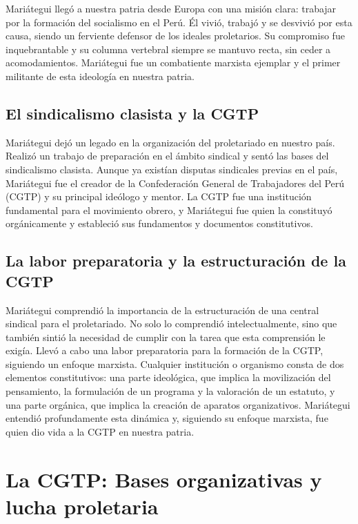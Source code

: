\documentclass[
  letterpaper,
  DIV=11,
  numbers=noendperiod]{scrartcl}
\begin{document}
Mariátegui llegó a nuestra patria desde Europa con una misión clara:
trabajar por la formación del socialismo en el Perú. Él vivió, trabajó y
se desvivió por esta causa, siendo un ferviente defensor de los ideales
proletarios. Su compromiso fue inquebrantable y su columna vertebral
siempre se mantuvo recta, sin ceder a acomodamientos. Mariátegui fue un
combatiente marxista ejemplar y el primer militante de esta ideología en
nuestra patria.

\hypertarget{el-sindicalismo-clasista-y-la-cgtp}{%
\subsection{El sindicalismo clasista y la
CGTP}\label{el-sindicalismo-clasista-y-la-cgtp}}

Mariátegui dejó un legado en la organización del proletariado en nuestro
país. Realizó un trabajo de preparación en el ámbito sindical y sentó
las bases del sindicalismo clasista. Aunque ya existían disputas
sindicales previas en el país, Mariátegui fue el creador de la
Confederación General de Trabajadores del Perú (CGTP) y su principal
ideólogo y mentor. La CGTP fue una institución fundamental para el
movimiento obrero, y Mariátegui fue quien la constituyó orgánicamente y
estableció sus fundamentos y documentos constitutivos.

\hypertarget{la-labor-preparatoria-y-la-estructuraciuxf3n-de-la-cgtp}{%
\subsection{La labor preparatoria y la estructuración de la
CGTP}\label{la-labor-preparatoria-y-la-estructuraciuxf3n-de-la-cgtp}}

Mariátegui comprendió la importancia de la estructuración de una central
sindical para el proletariado. No solo lo comprendió intelectualmente,
sino que también sintió la necesidad de cumplir con la tarea que esta
comprensión le exigía. Llevó a cabo una labor preparatoria para la
formación de la CGTP, siguiendo un enfoque marxista. Cualquier
institución o organismo consta de dos elementos constitutivos: una parte
ideológica, que implica la movilización del pensamiento, la formulación
de un programa y la valoración de un estatuto, y una parte orgánica, que
implica la creación de aparatos organizativos. Mariátegui entendió
profundamente esta dinámica y, siguiendo su enfoque marxista, fue quien
dio vida a la CGTP en nuestra patria.

\hypertarget{la-cgtp-bases-organizativas-y-lucha-proletaria}{%
\section{La CGTP: Bases organizativas y lucha
proletaria}\label{la-cgtp-bases-organizativas-y-lucha-proletaria}}
\end{document}
